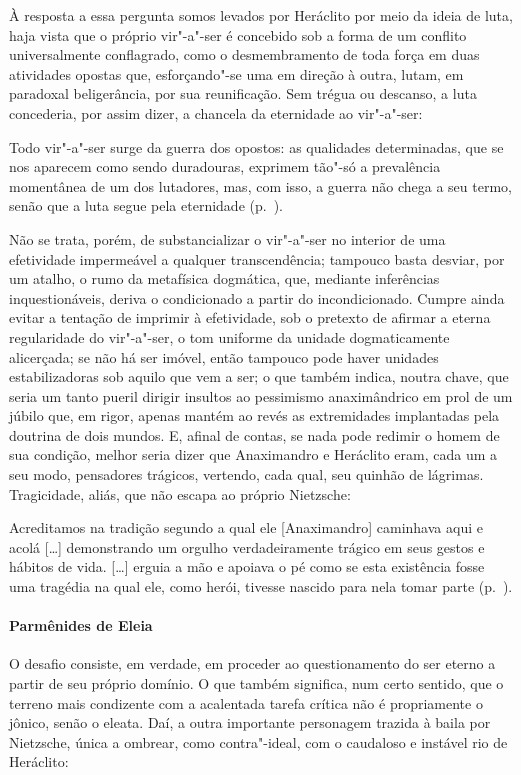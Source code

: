 À resposta a essa pergunta somos levados por Heráclito por meio da ideia
de luta, haja vista que o próprio vir"-a"-ser é concebido sob a forma de
um conflito universalmente conflagrado, como o desmembramento de toda
força em duas atividades opostas que, esforçando"-se uma em direção à
outra, lutam, em paradoxal beligerância, por sua reunificação. Sem
trégua ou descanso, a luta concederia, por assim dizer, a chancela da
eternidade ao vir"-a"-ser: 

\begin{hedraquote} 
Todo vir"-a"-ser surge da guerra
dos opostos: as qualidades determinadas, que se nos aparecem como sendo
duradouras, exprimem tão"-só a prevalência momentânea de um dos
lutadores, mas, com isso, a guerra não chega a seu termo, senão que a
luta segue pela eternidade (p.~\pageref{sereterno}).
\end{hedraquote} 

Não se trata, porém, de substancializar o vir"-a"-ser no interior de uma
efetividade impermeável a qualquer transcendência; tampouco basta
desviar, por um atalho, o rumo da metafísica dogmática, que, mediante
inferências inquestionáveis, deriva o condicionado a partir do
incondicionado. Cumpre ainda evitar a tentação de imprimir à
efetividade, sob o pretexto de afirmar a eterna regularidade do
vir"-a"-ser, o tom uniforme da unidade dogmaticamente alicerçada; se não
há ser imóvel, então tampouco pode haver unidades estabilizadoras sob
aquilo que vem a ser; o que também indica, noutra chave, que seria um
tanto pueril dirigir insultos ao pessimismo anaximândrico em prol de um
júbilo que, em rigor, apenas mantém ao revés as extremidades
implantadas pela doutrina de dois mundos. E, afinal de contas, se nada
pode redimir o homem de sua condição, melhor seria dizer que
Anaximandro e Heráclito eram, cada um a seu modo, pensadores trágicos,
vertendo, cada qual, seu quinhão de lágrimas.
Tragicidade, aliás, que não escapa ao próprio Nietzsche:

\begin{hedraquote} 
Acreditamos na tradição segundo a qual ele [Anaximandro]
caminhava aqui e acolá [\ldots] demonstrando um orgulho verdadeiramente
trágico em seus gestos e hábitos de vida. [\ldots] erguia a mão e apoiava
o pé como se esta existência fosse uma tragédia na qual ele, como
herói, tivesse nascido para nela tomar parte (p.~\pageref{acreditamosnatradicao}).
\end{hedraquote} 

\paragraph{Parmênides de Eleia} O desafio consiste, em verdade, em proceder ao questionamento do ser
eterno a partir de seu próprio domínio. O que também significa, num
certo sentido, que o terreno mais condizente com a acalentada tarefa
crítica não é propriamente o jônico, senão o eleata. Daí, a outra
importante personagem trazida à baila por Nietzsche, única a ombrear,
como contra"-ideal, com o caudaloso e instável rio de Heráclito:

